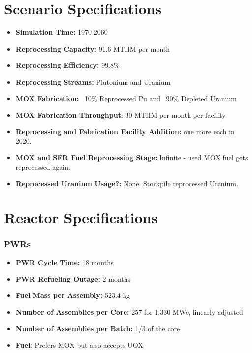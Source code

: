 \section{Scenario Specifications}


\begin{itemize}
	\item \textbf{Simulation Time:}  1970-2060 
	\item \textbf{Reprocessing Capacity:}  91.6 MTHM per month \cite{schneider_spent_2008}  
	\item \textbf{Reprocessing Efficiency:}  99.8\%  
	\item \textbf{Reprocessing Streams:}  Plutonium and Uranium  
	\item \textbf{\gls{MOX} Fabrication:}  ~10\% Reprocessed Pu and ~90\% Depleted Uranium  
	\item \textbf{\gls{MOX} Fabrication Throughput}: 30 MTHM per month per facility \cite{hugelmann_melox_1999} 
	\item \textbf{Reprocessing and Fabrication Facility Addition:}  one more each in 2020.
	\item \textbf{\gls{MOX} and \gls{SFR} Fuel Reprocessing Stage:}  Infinite - used \gls{MOX} fuel gets reprocessed again.  
	\item\textbf{Reprocessed Uranium Usage?:}  None. Stockpile reprocessed Uranium. \\
\end{itemize}

\section{Reactor Specifications}

\subsubsection{\gls{PWR}s}
\begin{itemize}
	\item \textbf{PWR Cycle Time:} 18 months  
	\item \textbf{PWR Refueling Outage:} 2 months  
	\item \textbf{Fuel Mass per Assembly:} 523.4 kg  
	\item \textbf{Number of Assemblies per Core:} 257 for 1,330 MWe, linearly adjusted  
	\item \textbf{Number of Assemblies per Batch:} 1/3 of the core  
	\item \textbf{Fuel:} Prefers \gls{MOX} but also accepts \gls{UOX}
\end{itemize}

